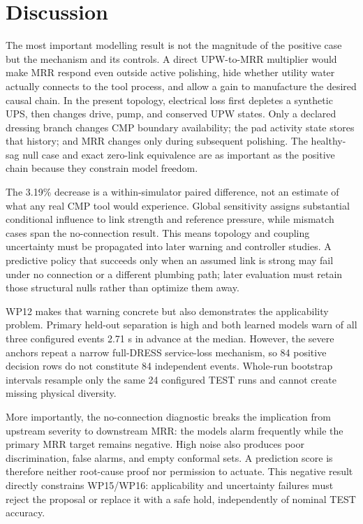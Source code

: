 \documentclass[10pt,twocolumn]{article}
\begin{document}
\section{Discussion}

The most important modelling result is not the magnitude of the positive case
but the mechanism and its controls. A direct UPW-to-MRR multiplier would make
MRR respond even outside active polishing, hide whether utility water actually
connects to the tool process, and allow a gain to manufacture the desired
causal chain. In the present topology, electrical loss first depletes a
synthetic UPS, then changes drive, pump, and conserved UPW states. Only a
declared dressing branch changes CMP boundary availability; the pad activity
state stores that history; and MRR changes only during subsequent polishing.
The healthy-sag null case and exact zero-link equivalence are as important as
the positive chain because they constrain model freedom.

The 3.19\% decrease is a within-simulator paired difference, not an estimate of
what any real CMP tool would experience. Global sensitivity assigns substantial
conditional influence to link strength and reference pressure, while mismatch
cases span the no-connection result. This means topology and coupling
uncertainty must be propagated into later warning and controller studies. A
predictive policy that succeeds only when an assumed link is strong may fail
under no connection or a different plumbing path; later evaluation must retain
those structural nulls rather than optimize them away.

WP12 makes that warning concrete but also demonstrates the applicability
problem. Primary held-out separation is high and both learned models warn of
all three configured events 2.71 s in advance at the median. However, the
severe anchors repeat a narrow full-DRESS service-loss mechanism, so 84
positive decision rows do not constitute 84 independent events. Whole-run
bootstrap intervals resample only the same 24 configured TEST runs and cannot
create missing physical diversity.

More importantly, the no-connection diagnostic breaks the implication from
upstream severity to downstream MRR: the models alarm frequently while the
primary MRR target remains negative. High noise also produces poor
discrimination, false alarms, and empty conformal sets. A prediction score is
therefore neither root-cause proof nor permission to actuate. This negative
result directly constrains WP15/WP16: applicability and uncertainty failures
must reject the proposal or replace it with a safe hold, independently of
nominal TEST accuracy.
\end{document}
